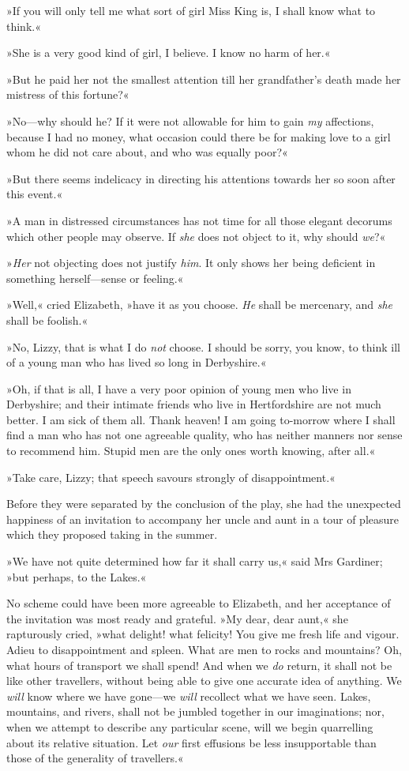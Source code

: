 »If you will only tell me what sort of girl Miss King is, I shall know what to think.«

»She is a very good kind of girl, I believe. I know no harm of her.«

»But he paid her not the smallest attention till her grandfather's death made her mistress of this fortune?«

»No—why should he? If it were not allowable for him to gain \textit{my} affections, because I had no money, what occasion could there be for making love to a girl whom he did not care about, and who was equally poor?«

»But there seems indelicacy in directing his attentions towards her so soon after this event.«

»A man in distressed circumstances has not time for all those elegant decorums which other people may observe. If \textit{she} does not object to it, why should \textit{we}?«

»\textit{Her} not objecting does not justify \textit{him}. It only shows her being deficient in something herself—sense or feeling.«

»Well,« cried Elizabeth, »have it as you choose. \textit{He} shall be mercenary, and \textit{she} shall be foolish.«

»No, Lizzy, that is what I do \textit{not} choose. I should be sorry, you know, to think ill of a young man who has lived so long in Derbyshire.«

»Oh, if that is all, I have a very poor opinion of young men who live in Derbyshire; and their intimate friends who live in Hertfordshire are not much better. I am sick of them all. Thank heaven! I am going to-morrow where I shall find a man who has not one agreeable quality, who has neither manners nor sense to recommend him. Stupid men are the only ones worth knowing, after all.«

»Take care, Lizzy; that speech savours strongly of disappointment.«

Before they were separated by the conclusion of the play, she had the unexpected happiness of an invitation to accompany her uncle and aunt in a tour of pleasure which they proposed taking in the summer.

»We have not quite determined how far it shall carry us,« said Mrs Gardiner; »but perhaps, to the Lakes.«

No scheme could have been more agreeable to Elizabeth, and her acceptance of the invitation was most ready and grateful. »My dear, dear aunt,« she rapturously cried, »what delight! what felicity! You give me fresh life and vigour. Adieu to disappointment and spleen. What are men to rocks and mountains? Oh, what hours of transport we shall spend! And when we \textit{do} return, it shall not be like other travellers, without being able to give one accurate idea of anything. We \textit{will} know where we have gone—we \textit{will} recollect what we have seen. Lakes, mountains, and rivers, shall not be jumbled together in our imaginations; nor, when we attempt to describe any particular scene, will we begin quarrelling about its relative situation. Let \textit{our} first effusions be less insupportable than those of the generality of travellers.«